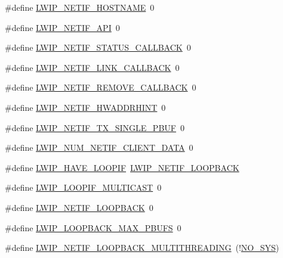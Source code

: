 \begin{DoxyCompactItemize}
\item 
\#define \hyperlink{group__lwip__opts__netif_gaa714dbfa66822ec4c6111bdb8cf753c1}{L\+W\+I\+P\+\_\+\+N\+E\+T\+I\+F\+\_\+\+H\+O\+S\+T\+N\+A\+ME}~0
\item 
\#define \hyperlink{group__lwip__opts__netif_gadd45fb65f2d0e6de5a0d14ff9e101b77}{L\+W\+I\+P\+\_\+\+N\+E\+T\+I\+F\+\_\+\+A\+PI}~0
\item 
\#define \hyperlink{group__lwip__opts__netif_gaffb97d89516c38d3fcb9e44e5d707f36}{L\+W\+I\+P\+\_\+\+N\+E\+T\+I\+F\+\_\+\+S\+T\+A\+T\+U\+S\+\_\+\+C\+A\+L\+L\+B\+A\+CK}~0
\item 
\#define \hyperlink{group__lwip__opts__netif_ga1a446932dd927cc4136ba654c13bb97b}{L\+W\+I\+P\+\_\+\+N\+E\+T\+I\+F\+\_\+\+L\+I\+N\+K\+\_\+\+C\+A\+L\+L\+B\+A\+CK}~0
\item 
\#define \hyperlink{group__lwip__opts__netif_ga9c942c2e9655b06d4f73c630d30f60bf}{L\+W\+I\+P\+\_\+\+N\+E\+T\+I\+F\+\_\+\+R\+E\+M\+O\+V\+E\+\_\+\+C\+A\+L\+L\+B\+A\+CK}~0
\item 
\#define \hyperlink{group__lwip__opts__netif_gad1d5e878d94b56ba687cef69be936ad9}{L\+W\+I\+P\+\_\+\+N\+E\+T\+I\+F\+\_\+\+H\+W\+A\+D\+D\+R\+H\+I\+NT}~0
\item 
\#define \hyperlink{group__lwip__opts__netif_gabafb9f64a80e51b56c0abbcfc1f7e04e}{L\+W\+I\+P\+\_\+\+N\+E\+T\+I\+F\+\_\+\+T\+X\+\_\+\+S\+I\+N\+G\+L\+E\+\_\+\+P\+B\+UF}~0
\item 
\#define \hyperlink{group__lwip__opts__netif_ga94a35212616f9a9aae5c98741612b936}{L\+W\+I\+P\+\_\+\+N\+U\+M\+\_\+\+N\+E\+T\+I\+F\+\_\+\+C\+L\+I\+E\+N\+T\+\_\+\+D\+A\+TA}~0
\item 
\#define \hyperlink{group__lwip__opts__loop_gaa2b1f736373cd896e212644aa453fbaf}{L\+W\+I\+P\+\_\+\+H\+A\+V\+E\+\_\+\+L\+O\+O\+P\+IF}~\hyperlink{group__lwip__opts__loop_ga724a0ea765d5a47d026d529725f31c01}{L\+W\+I\+P\+\_\+\+N\+E\+T\+I\+F\+\_\+\+L\+O\+O\+P\+B\+A\+CK}
\item 
\#define \hyperlink{group__lwip__opts__loop_ga10a878b390c2fbe421d82502001c7300}{L\+W\+I\+P\+\_\+\+L\+O\+O\+P\+I\+F\+\_\+\+M\+U\+L\+T\+I\+C\+A\+ST}~0
\item 
\#define \hyperlink{group__lwip__opts__loop_ga724a0ea765d5a47d026d529725f31c01}{L\+W\+I\+P\+\_\+\+N\+E\+T\+I\+F\+\_\+\+L\+O\+O\+P\+B\+A\+CK}~0
\item 
\#define \hyperlink{group__lwip__opts__loop_gaacc3ad5d0a771d45fb0a3e3a09b1dbea}{L\+W\+I\+P\+\_\+\+L\+O\+O\+P\+B\+A\+C\+K\+\_\+\+M\+A\+X\+\_\+\+P\+B\+U\+FS}~0
\item 
\#define \hyperlink{group__lwip__opts__loop_gaa28d13ddd5281b1912276991e7ea58c5}{L\+W\+I\+P\+\_\+\+N\+E\+T\+I\+F\+\_\+\+L\+O\+O\+P\+B\+A\+C\+K\+\_\+\+M\+U\+L\+T\+I\+T\+H\+R\+E\+A\+D\+I\+NG}~(!\hyperlink{openmote-cc2538_2lwip_2test_2unit_2lwipopts_8h_ae00ba99de94a5bf84d832be8976df59b}{N\+O\+\_\+\+S\+YS})

\end{DoxyCompactItemize}
